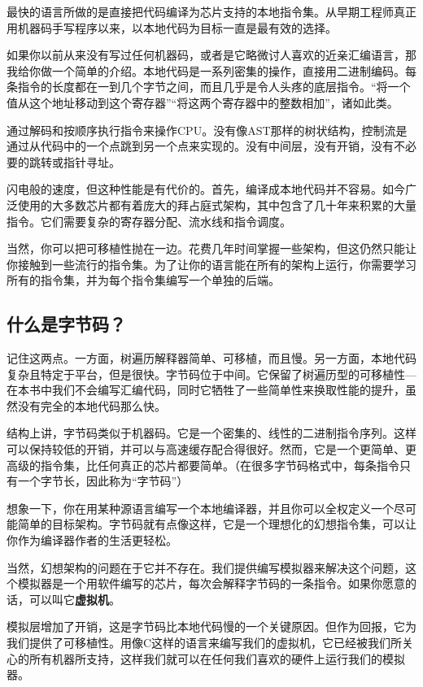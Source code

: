 \documentclass[cn,11pt,chinese]{elegantbook}
\begin{document}
{{{{{{{{{{{{{{{{{{{{{最快的语言所做的是直接把代码编译为芯片支持的本地指令集。从早期工程师真正用机器码手写程序以来，以本地代码为目标一直是最有效的选择。

如果你以前从来没有写过任何机器码，或者是它略微讨人喜欢的近亲汇编语言，那我给你做一个简单的介绍。本地代码是一系列密集的操作，直接用二进制编码。每条指令的长度都在一到几个字节之间，而且几乎是令人头疼的底层指令。“将一个值从这个地址移动到这个寄存器”“将这两个寄存器中的整数相加”，诸如此类。

通过解码和按顺序执行指令来操作CPU。没有像AST那样的树状结构，控制流是通过从代码中的一个点跳到另一个点来实现的。没有中间层，没有开销，没有不必要的跳转或指针寻址。

闪电般的速度，但这种性能是有代价的。首先，编译成本地代码并不容易。如今广泛使用的大多数芯片都有着庞大的拜占庭式架构，其中包含了几十年来积累的大量指令。它们需要复杂的寄存器分配、流水线和指令调度。

当然，你可以把可移植性抛在一边。花费几年时间掌握一些架构，但这仍然只能让你接触到一些流行的指令集。为了让你的语言能在所有的架构上运行，你需要学习所有的指令集，并为每个指令集编写一个单独的后端。

\subsection{什么是字节码？}

记住这两点。一方面，树遍历解释器简单、可移植，而且慢。另一方面，本地代码复杂且特定于平台，但是很快。字节码位于中间。它保留了树遍历型的可移植性—在本书中我们不会编写汇编代码，同时它牺牲了一些简单性来换取性能的提升，虽然没有完全的本地代码那么快。

结构上讲，字节码类似于机器码。它是一个密集的、线性的二进制指令序列。这样可以保持较低的开销，并可以与高速缓存配合得很好。然而，它是一个更简单、更高级的指令集，比任何真正的芯片都要简单。（在很多字节码格式中，每条指令只有一个字节长，因此称为“字节码”）

想象一下，你在用某种源语言编写一个本地编译器，并且你可以全权定义一个尽可能简单的目标架构。字节码就有点像这样，它是一个理想化的幻想指令集，可以让你作为编译器作者的生活更轻松。

当然，幻想架构的问题在于它并不存在。我们提供编写模拟器来解决这个问题，这个模拟器是一个用软件编写的芯片，每次会解释字节码的一条指令。如果你愿意的话，可以叫它\textbf{虚拟机}。

模拟层增加了开销，这是字节码比本地代码慢的一个关键原因。但作为回报，它为我们提供了可移植性。用像C这样的语言来编写我们的虚拟机，它已经被我们所关心的所有机器所支持，这样我们就可以在任何我们喜欢的硬件上运行我们的模拟器。

}}}}}}}}}}}}}}}}}}}}}
\end{document}

